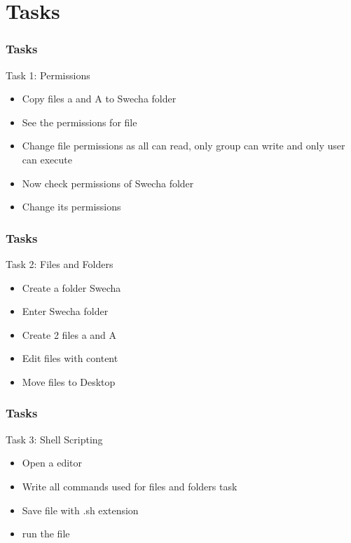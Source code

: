 \documentclass{beamer}
\begin{document}
\section{Tasks}
\begin{frame}
  \frametitle{Tasks}
  \begin{block}{ Task 1: Permissions}
  
  \begin{itemize}
    \item Copy files a and A to Swecha folder
    \item See the permissions for file
    \item Change file permissions as all can read, only group can write and only user can execute
    \item Now check permissions of Swecha folder
    \item Change its permissions
  \end{itemize}
  \end{block}
\end{frame}

\begin{frame}
  \frametitle{Tasks}
 \begin{block}{ Task 2: Files and Folders}
  
  \begin{itemize}
    \item Create a folder Swecha
    \item Enter Swecha folder
    \item Create 2 files a and A
    \item Edit files with content
    \item Move files to Desktop
   \end{itemize}
   \end{block}
\end{frame}


\begin{frame}
  \frametitle{Tasks}
 \begin{block}{ Task 3: Shell Scripting}
  
  \begin{itemize}
    \item Open a editor
    \item Write all commands used for files and folders task
    \item Save file with .sh extension
    \item run the file
  \end{itemize}
  \end{block}
\end{frame}
\end{document}
